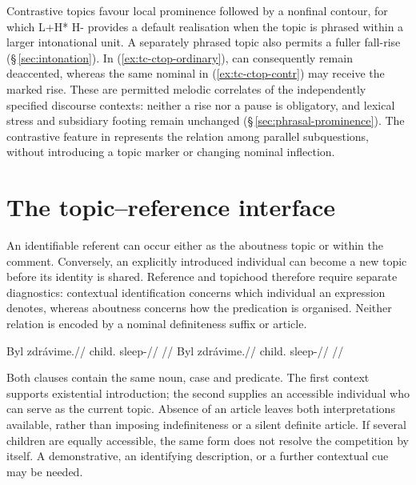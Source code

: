 Contrastive topics favour local prominence followed by a nonfinal contour,
 for which L+H* H- provides a default realisation when the topic is phrased
 within a larger intonational unit. A separately phrased topic also permits
 a fuller fall-rise (§\,\ref{sec:intonation}). In
 (\ref{ex:tc-ctop-ordinary}),  can consequently remain
 deaccented, whereas the same nominal in (\ref{ex:tc-ctop-contr}) may
 receive the marked rise. These are permitted melodic correlates of the
 independently specified discourse contexts: neither a rise nor a pause is
 obligatory, and lexical stress and subsidiary footing remain unchanged
 (§\,\ref{sec:phrasal-prominence}). The contrastive feature in
  represents the relation among parallel subquestions,
 without introducing a topic marker or changing nominal inflection.

\section{The topic--reference interface}\label{sec:tc-anchoring-interface}

An identifiable referent can occur either as the aboutness topic or within
 the comment. Conversely, an explicitly introduced individual can become a
 new topic before its identity is shared. Reference and topichood therefore
 require separate diagnostics: contextual identification concerns which
 individual an expression denotes, whereas aboutness concerns how the
 predication is organised. Neither relation is encoded by a nominal
 definiteness suffix or article.

\pex\label{ex:tc-anch-contrast}
\a\label{ex:tc-anch-overt}%
\begingl
\gla Byl zdrávime.//
\glb child.\Dir{} sleep-\Prog{}//
\glft {}
      //
\endgl
\a\label{ex:tc-anch-bare}%
\begingl
\gla Byl zdrávime.//
\glb child.\Dir{} sleep-\Prog{}//
\glft {}
      //
\endgl
\xe

\noindent Both clauses contain the same noun, case and predicate. The first
 context supports existential introduction; the second supplies an accessible
 individual who can serve as the current topic. Absence of an article leaves
 both interpretations available, rather than imposing indefiniteness or a
 silent definite article. If several children are equally accessible, the
 same form does not resolve the competition by itself. A demonstrative, an
 identifying description, or a further contextual cue may be needed.

